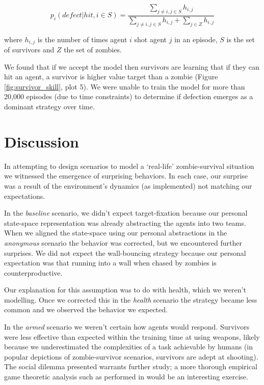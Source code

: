 \documentclass[11pt,a4paper]{article}
\begin{document}
\begin{equation}
  p_i(defect|hit, i\in S) = \frac{
    \sum\limits_{j\neq i, j\in S} h_{i,j}
  }{
    \sum\limits_{j\neq i, j\in S} h_{i,j}
    +
    \sum\limits_{j\in Z} h_{i,j}
  }
\end{equation}

where $h_{i,j}$ is the number of times agent $i$ shot agent $j$ in an episode, $S$ is the set of survivors and $Z$ the set of zombies.

We found that if we accept the model then survivors are learning that if they can hit an agent, a survivor is higher value target than a zombie (Figure \ref{fig:survivor_skill}, plot 5).
We were unable to train the model for more than 20,000 episodes (due to time constraints) to determine if defection emerges as a dominant strategy over time.

\section{Discussion}
\label{sec:discussion}

In attempting to design scenarios to model a `real-life' zombie-survival situation we witnessed the emergence of surprising behaviors.
In each case, our surprise was a result of the environment's dynamics (as implemented) not matching our expectations.

In the \emph{baseline} scenario, we didn't expect target-fixation because our personal state-space representation was already abstracting the agents into two teams.
When we aligned the state-space using our personal abstractions in the \emph{anonymous} scenario the behavior was corrected, but we encountered further surprises.
We did not expect the wall-bouncing strategy because our personal expectation was that running into a wall when chased by zombies is counterproductive.

Our explanation for this assumption was to do with health, which we weren't modelling.
Once we corrected this in the \emph{health} scenario the strategy became less common and we observed the behavior we expected.

In the \emph{armed} scenario we weren't certain how agents would respond.
Survivors were less effective than expected within the training time at using weapons, likely because we underestimated the complexities of a task achievable by humans (in popular depictions of zombie-survivor scenarios, survivors are adept at shooting).
The social dilemma presented warrants further study;
a more thorough empirical game theoretic analysis such as performed in \citealp{10.5555/3091125.3091194} would be an interesting exercise.
\end{document}
